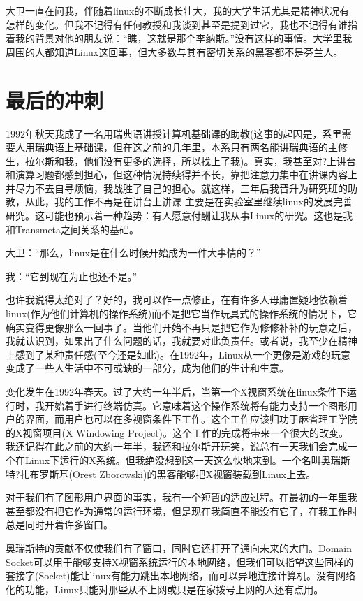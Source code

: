 大卫一直在问我，伴随着linux的不断成长壮大，我的大学生活尤其是精神状况有怎样的变化。但我不记得有任何教授和我谈到甚至是提到过它，我也不记得有谁指着我的背景对他的朋友说：“瞧，这就是那个李纳斯。”没有这样的事情。大学里我周围的人都知道Linux这回事，但大多数与其有密切关系的黑客都不是芬兰人。

 
\section{最后的冲刺}

1992年秋天我成了一名用瑞典语讲授计算机基础课的助教(这事的起因是，系里需要人用瑞典语上基础课，但在这之前的几年里，本系只有两名能讲瑞典语的主修生，拉尔斯和我，他们没有更多的选择，所以找上了我)。真实，我甚至对?上讲台和演算习题都感到担心，但这种情况持续得并不长，靠把注意力集中在讲课内容上并尽力不去自寻烦恼，我战胜了自己的担心。就这样，三年后我晋升为研究班的助教，从此，我的工作不再是在讲台上讲课 主要是在实验室里继续linux的发展完善研究。这可能也预示着一种趋势：有人愿意付酬让我从事Linux的研究。这也是我和Transmeta之间关系的基础。

大卫：“那么，linux是在什么时候开始成为一件大事情的？”

我：“它到现在为止也还不是。”

 

也许我说得太绝对了？好的，我可以作一点修正，在有许多人毋庸置疑地依赖着linux(作为他们计算机的操作系统)而不是把它当作玩具式的操作系统的情况下，它确实变得更像那么一回事了。当他们开始不再只是把它作为修修补补的玩意之后，我就认识到，如果出了什么问题的话，我就要对此负责任。或者说，我至少在精神上感到了某种责任感(至今还是如此)。在1992年，Linux从一个更像是游戏的玩意变成了一些人生活中不可或缺的一部分，成为他们的生计和生意。

 

变化发生在1992年春天。过了大约一年半后，当第一个X视窗系统在linux条件下运行时，我开始着手进行终端仿真。它意味着这个操作系统将有能力支持一个图形用户的界面，而用户也可以在多视窗条件下工作。这个工作应该归功于麻省理工学院的X视窗项目(X Windowing Project)。这个工作的完成将带来一个很大的改变。我还记得在此之前的大约一年半，我还和拉尔斯开玩笑，说总有一天我们会完成一个在Linux下运行的X系统。但我绝没想到这一天这么快地来到。一个名叫奥瑞斯特?扎布罗斯基(Orest Zborowski)的黑客能够把X视窗装载到Linux上去。

对于我们有了图形用户界面的事实，我有一个短暂的适应过程。在最初的一年里我甚至都没有把它作为通常的运行环境，但是现在我简直不能没有它了，在我工作时总是同时开着许多窗口。

奥瑞斯特的贡献不仅使我们有了窗口，同时它还打开了通向未来的大门。Domain Socket可以用于能够支持X视窗系统运行的本地网络，但我们可以指望这些同样的套接字(Socket)能让linux有能力跳出本地网络，而可以异地连接计算机。没有网络化的功能，Linux只能对那些从不上网或只是在家拨号上网的人还有点用。

